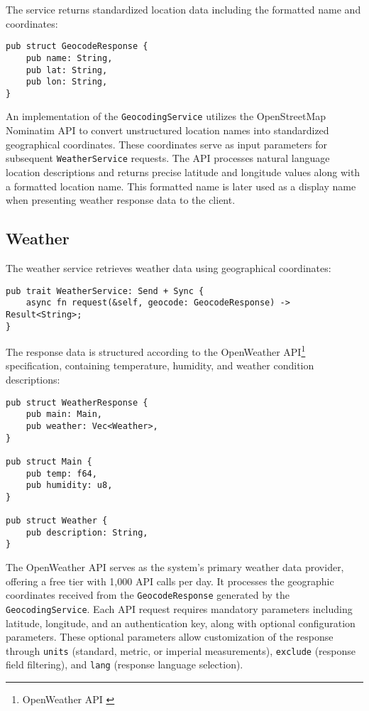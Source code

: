 The service returns standardized location data including the formatted name and coordinates:

\begin{verbatim}
pub struct GeocodeResponse {
    pub name: String,
    pub lat: String,
    pub lon: String,
}
\end{verbatim}

An implementation of the \texttt{GeocodingService} utilizes the OpenStreetMap Nominatim API
to convert unstructured location names into standardized geographical coordinates.
These coordinates serve as input parameters for subsequent \texttt{WeatherService} requests.
The API processes natural language location descriptions and returns precise latitude and longitude values along with a formatted location name.
This formatted name is later used as a display name when presenting weather response data to the client.

\subsection{Weather}
The weather service retrieves weather data using geographical coordinates:

\begin{verbatim}
pub trait WeatherService: Send + Sync {
    async fn request(&self, geocode: GeocodeResponse) -> Result<String>;
}
\end{verbatim}

The response data is structured according to the OpenWeather API\footnote{OpenWeather API \cite{openweathermap}} specification,
containing temperature, humidity, and weather condition descriptions:

\begin{verbatim}
pub struct WeatherResponse {
    pub main: Main,
    pub weather: Vec<Weather>,
}

pub struct Main {
    pub temp: f64,
    pub humidity: u8,
}

pub struct Weather {
    pub description: String,
}
\end{verbatim}

The OpenWeather API serves as the system's primary weather data provider, offering a free tier with 1,000 API calls per day.
It processes the geographic coordinates received from the \texttt{GeocodeResponse} generated by the \texttt{GeocodingService}.
Each API request requires mandatory parameters including latitude, longitude, and an authentication key, along with optional configuration parameters.
These optional parameters allow customization of the response through \texttt{units} (standard, metric, or imperial measurements),
\texttt{exclude} (response field filtering), and \texttt{lang} (response language selection).

